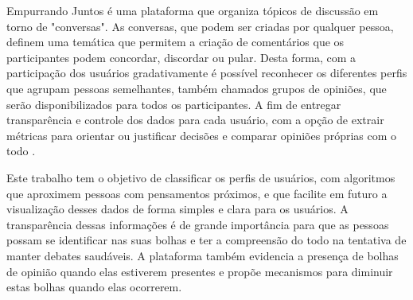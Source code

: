 Empurrando Juntos é uma plataforma que organiza tópicos de discussão em torno de "conversas". As conversas, que podem ser criadas por qualquer pessoa, definem uma temática que permitem a criação de comentários que os participantes podem concordar, discordar ou pular. 
Desta forma, com a participação dos usuários gradativamente é possível reconhecer os diferentes perfis que agrupam pessoas semelhantes, também chamados grupos de opiniões, que serão disponibilizados para todos os participantes. 
A fim de entregar transparência e controle dos dados para cada usuário, com a opção de extrair métricas para orientar ou justificar decisões e comparar opiniões próprias com o todo \cite{mendes2019}.





Este trabalho tem o objetivo de classificar os perfis de usuários, com algoritmos que aproximem pessoas com pensamentos próximos, e que facilite em futuro a visualização desses dados de forma simples e clara para os usuários. A transparência dessas informações é de grande importância para que as pessoas possam se identificar nas suas bolhas e ter a compreensão do todo na tentativa de manter debates saudáveis.
A plataforma também evidencia a presença de bolhas de opinião quando elas estiverem presentes e propõe mecanismos para diminuir estas bolhas quando elas ocorrerem.

